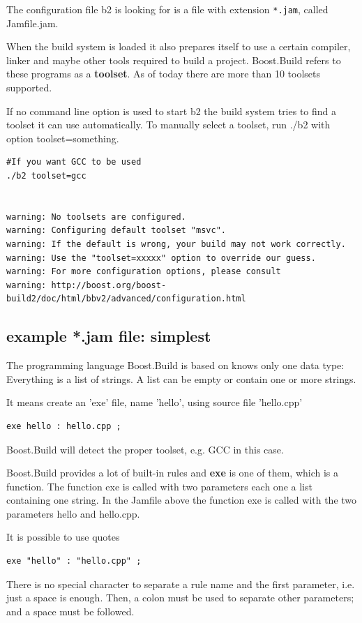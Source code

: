 The configuration file b2 is looking for is a file with extension \verb!*.jam!,
called Jamfile.jam.


When the build system is loaded it also prepares itself to use a certain
compiler, linker and maybe other tools required to build a project. Boost.Build
refers to these programs as a {\bf toolset}. As of today there are more than 10 toolsets supported.

If no command line option is used to start b2 the build system tries to find a
toolset it can use automatically. To manually select a toolset, run ./b2 with option
toolset=something.

\begin{verbatim}
#If you want GCC to be used 
./b2 toolset=gcc


warning: No toolsets are configured.
warning: Configuring default toolset "msvc".
warning: If the default is wrong, your build may not work correctly.
warning: Use the "toolset=xxxxx" option to override our guess.
warning: For more configuration options, please consult
warning: http://boost.org/boost-build2/doc/html/bbv2/advanced/configuration.html
\end{verbatim}

\subsection{example *.jam file: simplest}

The programming language Boost.Build is based on knows only one data type:
Everything is a list of strings. A list can be empty or contain one or more
strings.


It means create an 'exe' file, name 'hello', using source file 'hello.cpp'
\begin{verbatim}
exe hello : hello.cpp ; 
\end{verbatim}
Boost.Build will detect the proper toolset, e.g. GCC in this case.

Boost.Build provides a lot of built-in rules and {\bf exe} is one of them, which
is a function. The function exe is called with two parameters each one a list
containing one string. In the Jamfile above the function exe is called with the
two parameters hello and hello.cpp.

It is possible to use quotes
\begin{verbatim}
exe "hello" : "hello.cpp" ; 
\end{verbatim}
There is no special character to separate a rule name and the first parameter, i.e. just a space is enough.
Then, a colon must be used to separate other parameters; and a space must be followed. 

